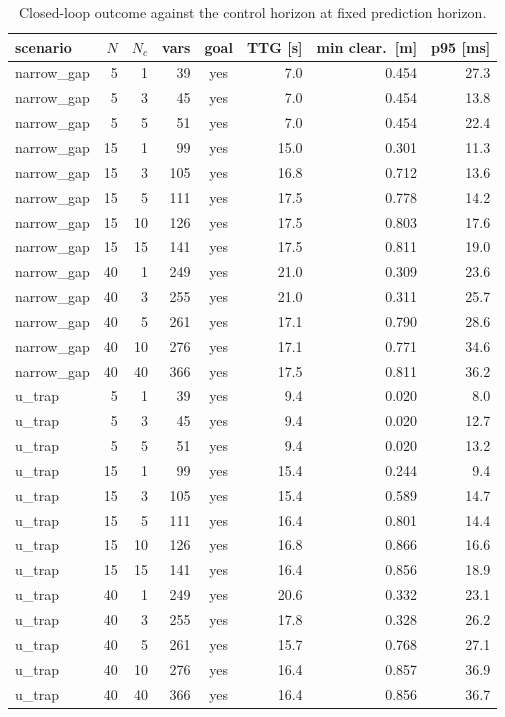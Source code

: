 \begin{table}[htbp]
  \centering
  \small
  \caption{Closed-loop outcome against the control horizon at fixed prediction horizon.}
  \label{res:tab:nc}
  \begin{tabular}{lrrrcrrr}
    \toprule
    scenario & $N$ & $N_c$ & vars & goal & TTG [s] & min clear.\ [m] & p95 [ms] \\
    \midrule
    narrow\_gap & 5 & 1 & 39 & yes & 7.0 & 0.454 & 27.3 \\
    narrow\_gap & 5 & 3 & 45 & yes & 7.0 & 0.454 & 13.8 \\
    narrow\_gap & 5 & 5 & 51 & yes & 7.0 & 0.454 & 22.4 \\
    narrow\_gap & 15 & 1 & 99 & yes & 15.0 & 0.301 & 11.3 \\
    narrow\_gap & 15 & 3 & 105 & yes & 16.8 & 0.712 & 13.6 \\
    narrow\_gap & 15 & 5 & 111 & yes & 17.5 & 0.778 & 14.2 \\
    narrow\_gap & 15 & 10 & 126 & yes & 17.5 & 0.803 & 17.6 \\
    narrow\_gap & 15 & 15 & 141 & yes & 17.5 & 0.811 & 19.0 \\
    narrow\_gap & 40 & 1 & 249 & yes & 21.0 & 0.309 & 23.6 \\
    narrow\_gap & 40 & 3 & 255 & yes & 21.0 & 0.311 & 25.7 \\
    narrow\_gap & 40 & 5 & 261 & yes & 17.1 & 0.790 & 28.6 \\
    narrow\_gap & 40 & 10 & 276 & yes & 17.1 & 0.771 & 34.6 \\
    narrow\_gap & 40 & 40 & 366 & yes & 17.5 & 0.811 & 36.2 \\
    u\_trap & 5 & 1 & 39 & yes & 9.4 & 0.020 & 8.0 \\
    u\_trap & 5 & 3 & 45 & yes & 9.4 & 0.020 & 12.7 \\
    u\_trap & 5 & 5 & 51 & yes & 9.4 & 0.020 & 13.2 \\
    u\_trap & 15 & 1 & 99 & yes & 15.4 & 0.244 & 9.4 \\
    u\_trap & 15 & 3 & 105 & yes & 15.4 & 0.589 & 14.7 \\
    u\_trap & 15 & 5 & 111 & yes & 16.4 & 0.801 & 14.4 \\
    u\_trap & 15 & 10 & 126 & yes & 16.8 & 0.866 & 16.6 \\
    u\_trap & 15 & 15 & 141 & yes & 16.4 & 0.856 & 18.9 \\
    u\_trap & 40 & 1 & 249 & yes & 20.6 & 0.332 & 23.1 \\
    u\_trap & 40 & 3 & 255 & yes & 17.8 & 0.328 & 26.2 \\
    u\_trap & 40 & 5 & 261 & yes & 15.7 & 0.768 & 27.1 \\
    u\_trap & 40 & 10 & 276 & yes & 16.4 & 0.857 & 36.9 \\
    u\_trap & 40 & 40 & 366 & yes & 16.4 & 0.856 & 36.7 \\
    \bottomrule
  \end{tabular}
\end{table}

